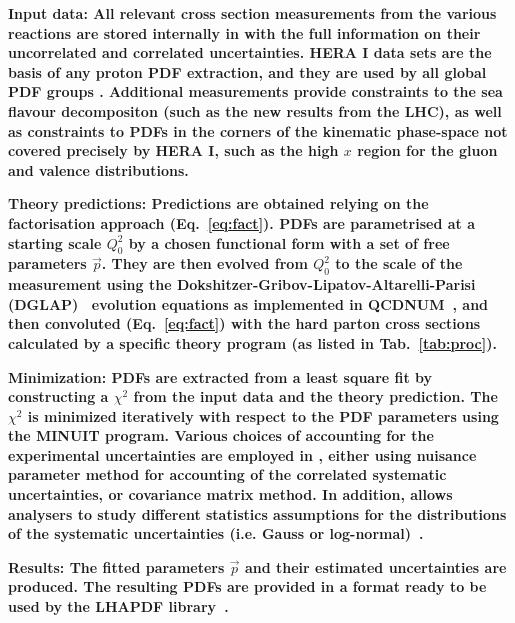\begin{description}
\item 
\bf {Input data:} \rm  All relevant cross section measurements from the various reactions
are stored internally in \fitter with the full information on their uncorrelated and correlated
uncertainties. HERA I data sets are the basis of any proton PDF extraction, and they are used by all global PDF groups \cite{MSTWpdf, CT10pdf, NNPDFpdf, ABMpdf, JRpdf}. Additional measurements provide constraints to the sea flavour decompositon (such as the new results from the LHC), as well as constraints to PDFs in the corners of the kinematic phase-space not covered precisely by HERA I, such as the high $x$ region for the gluon and valence distributions.
\item
\bf{Theory predictions:} \rm Predictions are obtained relying on the factorisation approach (Eq.~\ref{eq:fact}). PDFs are parametrised at a starting scale $Q_0^2$  by a chosen functional form with a set of free parameters $\vec{p}$. They are then evolved from $Q_0^2$ to the scale of the measurement using the 
Dokshitzer-Gribov-Lipatov-Altarelli-Parisi 
(DGLAP)~\cite{Gribov:1972ri, Gribov:1972rt, Lipatov:1974qm,
Dokshitzer:1977sg, Altarelli:1977zs} evolution equations 
as implemented in QCDNUM~\cite{qcdnum}, 
and then convoluted (Eq.~\ref{eq:fact}) with the hard parton cross sections calculated by
a specific theory program (as listed in Tab.~\ref{tab:proc}).
\item
\bf{Minimization:} \rm  PDFs are extracted from a least square fit by constructing a 
$\chi^2$ from the input data and the theory prediction.
The $\chi^2$ is  minimized iteratively 
with respect to the PDF parameters using the MINUIT\cite{minuit} program.
Various choices of accounting for the experimental uncertainties are employed in \fitter, 
either using nuisance parameter method for accounting of the correlated systematic uncertainties, 
or covariance matrix method. In addition, \fitter allows analysers to study different statistics 
assumptions for the distributions of the systematic uncertainties (i.e. Gauss or log-normal)~\cite{hera-lhc:report2009}.
%
%
\item
\bf{Results:} \rm  The fitted parameters $\vec{p}$ and their estimated uncertainties are produced. 
The resulting PDFs are provided in a format ready to be used by the LHAPDF 
library~\cite{lhapdf,lhapdfweb}.

\end{description}
